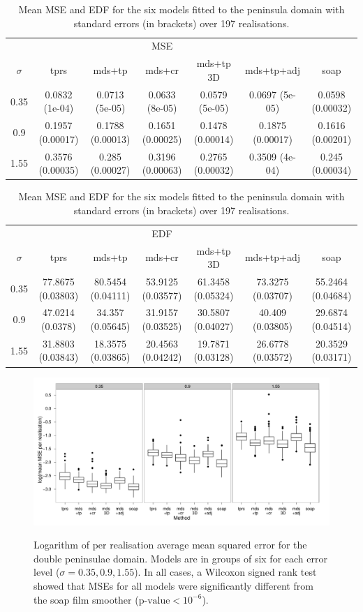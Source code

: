 \begin{table}
\centering
\begin{tabular}{c c c c c c c}
 & &  & MSE  & & &\\ 
$\sigma$  & tprs & mds+tp & mds+cr & mds+tp 3D & mds+tp+adj & soap\\ 
\hline
0.35  & 0.0832 (1e-04) & 0.0713 (5e-05) & 0.0633 (8e-05) & 0.0579 (5e-05) & 0.0697 (5e-05) & 0.0598 (0.00032) \\ 
0.9  & 0.1957 (0.00017) & 0.1788 (0.00013) & 0.1651 (0.00025) & 0.1478 (0.00014) & 0.1875 (0.00017) & 0.1616 (0.00201) \\ 
1.55  & 0.3576 (0.00035) & 0.285 (0.00027) & 0.3196 (0.00063) & 0.2765 (0.00032) & 0.3509 (4e-04) & 0.245 (0.00034) \\
\end{tabular}
\begin{tabular}{c c c c c c c}
 & &  & EDF  & & &\\ 
$\sigma$  & tprs & mds+tp & mds+cr & mds+tp 3D & mds+tp+adj & soap\\ 
\hline
0.35  & 77.8675 (0.03803) & 80.5454 (0.04111) & 53.9125 (0.03577) & 61.3458 (0.05324) & 73.3275 (0.03707) & 55.2464 (0.04684)\\ 
0.9  & 47.0214 (0.0378) & 34.357 (0.05645) & 31.9157 (0.03525) & 30.5807 (0.04027) & 40.409 (0.03805) & 29.6874 (0.04514) \\
1.55  & 31.8803 (0.03843) & 18.3575 (0.03865) & 20.4563 (0.04242) & 19.7871 (0.03128) & 26.6778 (0.03572) & 20.3529 (0.03171)\\ 
\end{tabular}
\caption{Mean MSE and EDF for the six models fitted to the peninsula domain with standard errors (in brackets) over 197 realisations.}
\label{bigwt2resultstable}
\end{table}

\begin{figure}
\centering
\includegraphics[width=9.5in]{mds/figs/big-mds-wt2-boxplot.pdf} \\
\caption{Logarithm of per realisation average mean squared error for the double peninsulae domain. Models are in groups of six for each error level ($\sigma=0.35,0.9,1.55$). In all cases, a Wilcoxon signed rank test showed that MSEs for all models were significantly different from the soap film smoother ($\text{p-value} < 10^{-6}$).}
\label{big-wt2-mses}
\end{figure}


